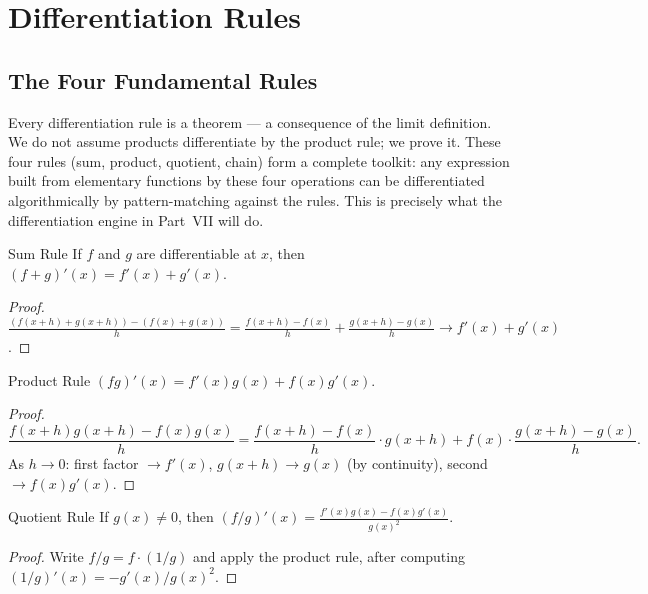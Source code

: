 \documentclass[12pt, openany]{book}
\theoremstyle{plain}
\theoremstyle{definition}
\theoremstyle{remark}
\begin{document}
\chapter{Differentiation Rules}
\color{black}

\section{The Four Fundamental Rules}

Every differentiation rule is a theorem --- a consequence of the limit definition.  We do not assume products differentiate by the product rule; we prove it.  These four rules (sum, product, quotient, chain) form a complete toolkit: any expression built from elementary functions by these four operations can be differentiated algorithmically by pattern-matching against the rules.  This is precisely what the differentiation engine in Part~VII will do.

\begin{thmbox}{Sum Rule}
If $f$ and $g$ are differentiable at $x$, then $(f+g)'(x) = f'(x) + g'(x)$.
\end{thmbox}
\color{black}

\begin{proof}
$\frac{(f(x+h)+g(x+h)) - (f(x)+g(x))}{h} = \frac{f(x+h)-f(x)}{h} + \frac{g(x+h)-g(x)}{h} \to f'(x) + g'(x)$.
\end{proof}

\begin{thmbox}{Product Rule}
$(fg)'(x) = f'(x)g(x) + f(x)g'(x)$.
\end{thmbox}
\color{black}

\begin{proof}
\[ \frac{f(x+h)g(x+h) - f(x)g(x)}{h} = \frac{f(x+h)-f(x)}{h} \cdot g(x+h) + f(x) \cdot \frac{g(x+h)-g(x)}{h}. \]
As $h \to 0$: first factor $\to f'(x)$, $g(x+h) \to g(x)$ (by continuity), second $\to f(x)g'(x)$.
\end{proof}

\begin{thmbox}{Quotient Rule}
If $g(x) \neq 0$, then $(f/g)'(x) = \frac{f'(x)g(x) - f(x)g'(x)}{g(x)^2}$.
\end{thmbox}
\color{black}

\begin{proof}
Write $f/g = f \cdot (1/g)$ and apply the product rule, after computing $(1/g)'(x) = -g'(x)/g(x)^2$.
\end{proof}
\end{document}
